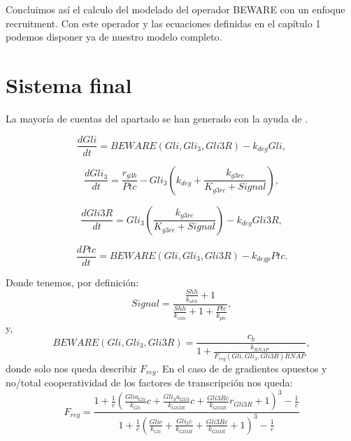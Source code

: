 Concluimos así el calculo del modelado del operador BEWARE con un enfoque recruitment. Con este operador y las ecuaciones definidas en el capítulo 1 podemos disponer ya de nuestro modelo completo.

\section{Sistema final}

La mayoría de cuentas del apartado se han generado con la ayuda de \cite{sympy}.

\begin{equation}
\frac{dGli}{dt} = BEWARE(Gli, Gli_3, Gli3R)-k_{deg}Gli,
\label{equ:12}
\end{equation}

\begin{equation}
\frac{dGli_3}{dt} = \frac{r_{g3b}}{Ptc}-Gli_3\left(k_{deg}+\frac{k_{g3rc}}{K_{g3rc}+Signal}\right),
\label{eq:22}
\end{equation}

\begin{equation}
\frac{dGli3R}{dt}= Gli_3\left(\frac{k_{g3rc}}{K_{g3rc}+Signal}\right)-k_{deg}Gli3R,
\label{eq:32}
\end{equation}

\begin{equation}
\frac{dPtc}{dt} = BEWARE(Gli, Gli_3, Gli3R)-k_{degp}Ptc.
\label{eq:42}
\end{equation}


Donde tenemos, por definición:
 \begin{equation}
Signal=\frac{\frac{Shh}{k_{shh}} + 1}{\frac{Shh}{k_{shh}} + 1 + \frac{Ptc}{k_{ptc}}},
\label{signal} \end{equation}
y,
\begin{equation}
BEWARE(Gli, Gli_3, Gli3R)=\frac{c_{b}}{1 + \frac{k_{RNAP}}{F_{reg}(Gli, Gli_3, Gli3R) RNAP}},
\end{equation}
donde solo nos queda describir $F_{reg}$. En el caso de de gradientes opuestos y no/total cooperatividad de los factores de transcripción nos queda:
\begin{equation}
F_{reg}=\frac{1 + \frac{1}{c} \left(\frac{Gli a_{Gli}}{k_{Gli}} c + \frac{Gli_{3} a_{Gli3}}{k_{Gli3R}} c + \frac{Gli3R c}{k_{Gli3R}} r_{Gli3R} + 1\right)^{3} - \frac{1}{c}}{1 + \frac{1}{c} \left(\frac{Gli c}{k_{Gli}} + \frac{Gli_{3} c}{k_{Gli3R}} + \frac{Gli3R c}{k_{Gli3R}} + 1\right)^{3} - \frac{1}{c}}
\end{equation}

